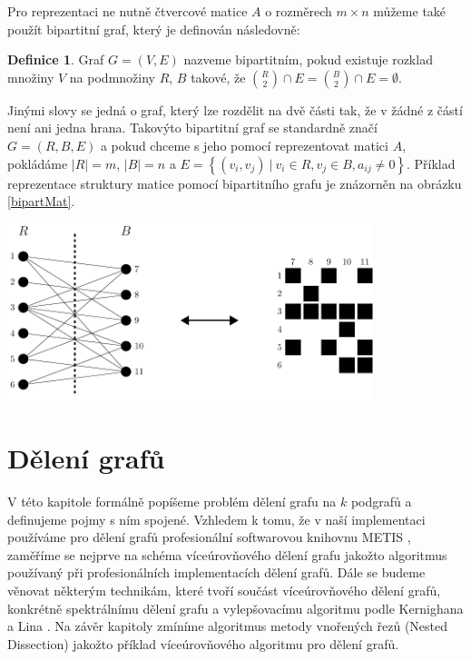 \documentclass[11pt,american,czech,oneside]{book}
\theoremstyle{plain}
\theoremstyle{definition}
\newtheorem{definition}{Definice}
\begin{document}
Pro reprezentaci ne nutně čtvercové matice $A$ o rozměrech $m\times n$ můžeme také použít bipartitní graf, který je definován následovně:

\begin{definition}
  Graf $G=(V,E)$ nazveme bipartitním, pokud existuje rozklad množiny $V$ na podmnožiny $R$, $B$ takové, že ${R \choose 2} \cap E = {B \choose 2} \cap E = \emptyset$.
\end{definition}

Jinými slovy se jedná o graf, který lze rozdělit na dvě části tak, že v žádné z částí není ani jedna hrana. Takovýto bipartitní graf se standardně značí $G=(R,B,E)$ a pokud chceme s jeho pomocí reprezentovat matici $A$, pokládáme $|R|=m$, $|B|=n$ a $E = \left\{(v_i,v_j) \ | \ v_i \in R, v_j \in B, a_{ij} \neq 0 \right\}$. Příklad reprezentace struktury matice pomocí bipartitního grafu je znázorněn na obrázku \ref{bipartMat}.

\bigskip
{
  \centering
  \includegraphics[width=0.8\textwidth]{pictures/bipart_grmat.pdf}
}


\chapter{Dělení grafů}

V této kapitole formálně popíšeme problém dělení grafu na $k$ podgrafů a definujeme pojmy s ním spojené. Vzhledem k tomu, že v naší implementaci používáme pro dělení grafů profesionální softwarovou knihovnu METIS \cite{kary:13}, zaměříme se nejprve na schéma víceúrovňového dělení grafu jakožto algoritmus používaný při profesionálních implementacích dělení grafů. Dále se budeme věnovat některým technikám, které tvoří součást víceúrovňového dělení grafů, konkrétně spektrálnímu dělení grafu a vylepšovacímu algoritmu podle Kernighana a Lina \cite{keli:70}. Na závěr kapitoly zmíníme algoritmus metody vnořených řezů (Nested Dissection) jakožto příklad víceúrovňového algoritmu pro dělení grafů.
\end{document}
